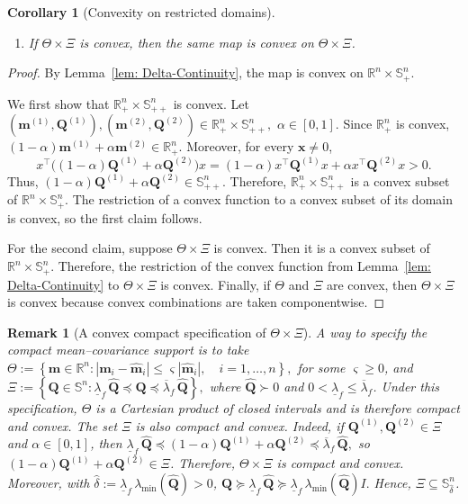 \documentclass[opre,sglanonrev]{informs4}
\newtheorem{corollary}{Corollary}
\newtheorem{remark}{Remark}
\newcommand{\mbR}{\mathbb R}
\newcommand{\mbS}{\mathbb S}
\newcommand{\bmean}{\bm{m}}
\newcommand{\bx}{\bm{x}}
\newcommand{\bQ}{\bm Q}
\newcommand{\ubar}[1]{\underline{#1}}
\begin{document}
{\begin{APPENDICES}
\begin{corollary}[Convexity on restricted domains]
\begin{enumerate}[label=\textit{\roman*)},leftmargin=1.5em]
\item If \(\Theta\times\Xi\) is convex, then the same map is convex on
\(\Theta\times\Xi\).
\end{enumerate}
\end{corollary}

\begin{proof}
By Lemma~\ref{lem: Delta-Continuity}, the map is convex on
\(\mbR^n\times\mbS^n_+\).

We first show that \(\mbR^n_+\times\mbS^n_{++}\) is convex. Let $(\bmean^{(1)},\bQ^{(1)}),(\bmean^{(2)},\bQ^{(2)})
\in
\mbR^n_+\times\mbS^n_{++},
\,\,
\alpha\in[0,1].$
Since \(\mbR^n_+\) is convex, $(1-\alpha)\bmean^{(1)}+\alpha\bmean^{(2)}\in\mbR^n_+.$
Moreover, for every \(\bx\neq0\),
\[
x^\top\bigl((1-\alpha)\bQ^{(1)}+\alpha\bQ^{(2)}\bigr)x
=
(1-\alpha)x^\top\bQ^{(1)}x+\alpha x^\top\bQ^{(2)}x>0.
\]
Thus, $(1-\alpha)\bQ^{(1)}+\alpha\bQ^{(2)}
\in
\mbS^n_{++}.$ Therefore, \(\mbR^n_+\times\mbS^n_{++}\) is a convex subset of
\(\mbR^n\times\mbS^n_+\). The restriction of a convex function to a
convex subset of its domain is convex, so the first claim follows.

For the second claim, suppose \(\Theta\times\Xi\) is convex. Then it is a convex
subset of \(\mbR^n\times\mbS^n_+\). Therefore, the restriction of the
convex function from Lemma~\ref{lem: Delta-Continuity} to \(\Theta\times\Xi\) is
convex. Finally, if \(\Theta\) and \(\Xi\) are convex, then
\(\Theta\times\Xi\) is convex because convex combinations are taken componentwise.
\end{proof}

\begin{remark}[A convex compact specification of \(\Theta\times\Xi\)]
\label{rem:convex-compact-support-specification}
A way to specify the compact mean--covariance support is to take $\Theta
:=
\left\{
\bmean\in\mbR^n:
|\bmean_i-\hat{\bmean}_i|
\le
\varsigma |\hat{\bmean}_i|,
\quad i=1,\ldots,n
\right\},$
for some \(\varsigma\ge0\), and $\Xi
:=
\left\{
\bQ\in\mbS^n:
\ubar \lambda_f\,\hat{\bQ}
\preceq
\bQ
\preceq
\overline \lambda_f\,\hat{\bQ}
\right\},$
where \(\hat{\bQ}\succ0\) and
\(0<\ubar \lambda_f\le\overline \lambda_f\). Under this specification,
\(\Theta\) is a Cartesian product of closed intervals and is therefore compact
and convex. The set \(\Xi\) is also compact and convex. Indeed, if
\(\bQ^{(1)},\bQ^{(2)}\in\Xi\) and \(\alpha\in[0,1]\), then $\ubar \lambda_f\,\hat{\bQ}
\preceq
(1-\alpha)\bQ^{(1)}+\alpha\bQ^{(2)}
\preceq
\overline \lambda_f\,\hat{\bQ},$
so \((1-\alpha)\bQ^{(1)}+\alpha\bQ^{(2)}\in\Xi\). Therefore,
\(\Theta\times\Xi\) is compact and convex. Moreover, with $\hat\delta:=\ubar \lambda_f\,\lambda_{\min}(\hat{\bQ})>0$, $\bQ\succeq \ubar \lambda_f\,\hat{\bQ}
\succeq
\ubar \lambda_f\,\lambda_{\min}(\hat{\bQ})I.$ Hence, \(\Xi\subseteq\mbS^n_{\hat\delta}\).
\end{remark}


\end{APPENDICES}}
\end{document}
